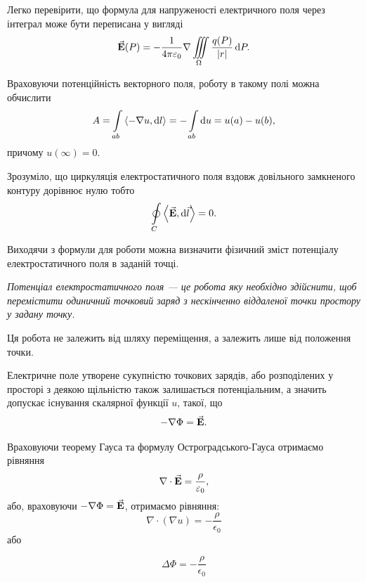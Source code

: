 Легко перевірити, що формула для напруженості електричного поля через інтеграл може бути переписана у вигляді
\begin{equation}
	{\vec{\mathbf{E}}} (P) = - \frac{1}{4 \pi \varepsilon_0} \nabla \displaystyle\iiint\limits_\Omega \frac{q(P)}{|r|} \mathop{}\!\mathrm{d} P.
\end{equation}

Враховуючи потенційність векторного поля, роботу в такому полі можна обчислити
\begin{equation}
	A = \Int_{ab} \langle - \nabla u, \diff l \rangle = - \Int_{ab} \diff u = u(a) - u(b),
\end{equation}
причому $u(\infty) = 0$. \medskip

\begin{remark}
	Зрозуміло, що циркуляція електростатичного поля вздовж довільного замкненого контуру дорівнює нулю тобто
	\begin{equation}
		\Oint_C \langle \vecf E, \diff \vec l \rangle = 0.
	\end{equation}
\end{remark}

Виходячи з формули для роботи можна визначити фізичний зміст потенціалу електростатичного поля в заданій точці. 

\begin{definition}
	\it{Потенціал електростатичного поля} --- це робота яку необхідно здійснити, щоб перемістити одиничний точковий заряд з нескінченно віддаленої точки простору у задану точку.
\end{definition}

\begin{remark}
	Ця робота не залежить від шляху переміщення, а залежить лише від положення точки.
\end{remark}
	 
Електричне поле утворене сукупністю точкових зарядів, або розподілених у просторі з деякою щільністю також залишається потенціальним, а значить допускає існування скалярної функції $u$, такої, що
\begin{equation}
	-\nabla \Phi = {\vec{\mathbf{E}}}.
\end{equation}

Враховуючи теорему Гауса та формулу Остроградського-Гауса отримаємо рівняння
\begin{equation}
	\nabla \cdot {\vec{\mathbf{E}}} = \frac{\rho}{\varepsilon_0},
\end{equation}
або, враховуючи $-\nabla \Phi = {\vec{\mathbf{E}}}$, отримаємо рівняння:
\begin{equation}
	\nabla \cdot (\nabla u) = -\frac{\rho}{\epsilon_0}
\end{equation}
або
\begin{th_equation}
	\begin{equation}
		\Delta \Phi = - \frac{\rho}{\epsilon_0}
	\end{equation}
\end{th_equation}

